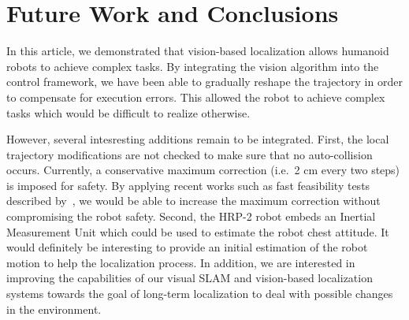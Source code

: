 \section{Future Work and Conclusions}\label{sec:conclusions}

In this article, we demonstrated that vision-based localization allows
humanoid robots to achieve complex tasks. By integrating the vision
algorithm into the control framework, we have been able to gradually
reshape the trajectory in order to compensate for execution
errors. This allowed the robot to achieve complex tasks which would be
difficult to realize otherwise.

However, several intesresting additions remain to be
integrated. First, the local trajectory modifications are not checked
to make sure that no auto-collision occurs. Currently, a conservative
maximum correction (i.e.\ 2 cm every two steps) is imposed for
safety. By applying recent works such as fast feasibility tests
described by~\citet{Perrin10icra}, we would be able to increase the
maximum correction without compromising the robot safety. Second, the
HRP-2 robot embeds an Inertial Measurement Unit which could be used to
estimate the robot chest attitude. It would definitely be interesting
to provide an initial estimation of the robot motion to help the
localization process. In addition, we are interested in improving the
capabilities of our visual SLAM and vision-based localization systems
towards the goal of long-term localization to deal with possible
changes in the environment.


